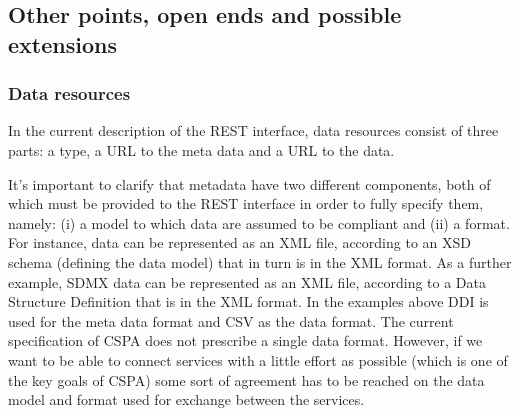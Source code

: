 \documentclass[a4paper]{article}
\begin{document}
\subsection{Other points, open ends and possible extensions}

\subsubsection{Data resources}
\label{sec:dataresources}
In the current description of the REST interface, data resources consist of
three parts: a type, a URL to the meta data and a URL to the data.

It's important to clarify that metadata have two different components, both of
which must be provided to the REST interface in order to fully specify them,
namely: (i) a model to which data are assumed to be compliant and (ii) a
format. For instance, data can be represented as an XML file, according to an
XSD schema (defining the data model) that in turn is in the XML format. As a
further example, SDMX data can be represented as an XML file, according to a
Data Structure Definition that is in the XML format.  In the examples above DDI
is used for the meta data format and CSV as the data format.  The current
specification of CSPA does not prescribe a single data format.  However, if we
want to be able to connect services with a little effort as possible (which is
one of the key goals of CSPA) some sort of agreement has to be reached on the
data model and format used for exchange between the services. 
\end{document}
